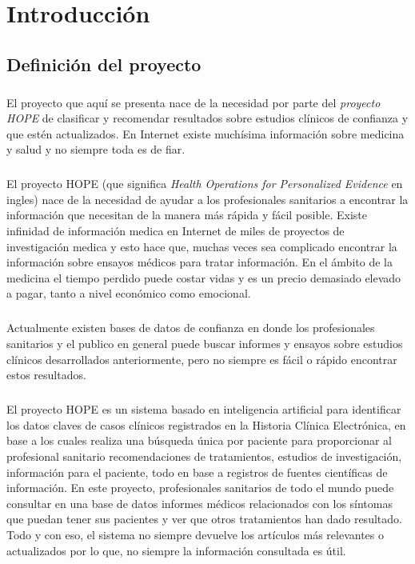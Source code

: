 \documentclass[10pt,a4paper,oneside]{book}
\begin{document}
\chapter{Introducción}

\section{Definición del proyecto}
\label{def:def1}

\paragraph{}
El proyecto que aquí se presenta nace de la necesidad por parte del \textit{proyecto HOPE} de clasificar y recomendar resultados sobre estudios clínicos de confianza y que estén actualizados. En Internet existe muchísima información sobre medicina y salud y no siempre toda es de fiar.

\paragraph{}
El proyecto HOPE (que significa \textit{Health Operations for Personalized Evidence} en ingles) nace de la necesidad de ayudar a los profesionales sanitarios a encontrar la información que necesitan de la manera más rápida y fácil posible. Existe infinidad de información medica en Internet de miles de proyectos de investigación medica y esto hace que, muchas veces sea complicado encontrar la información sobre ensayos médicos para tratar información. En el ámbito de la medicina el tiempo perdido puede costar vidas y es un precio demasiado elevado a pagar, tanto a nivel económico como emocional.

\paragraph{}
Actualmente existen bases de datos de confianza en donde los profesionales sanitarios y el publico en general puede buscar informes y ensayos sobre estudios clínicos desarrollados anteriormente, pero no siempre es fácil o rápido encontrar estos resultados.

\paragraph{}
El proyecto HOPE es un sistema basado en inteligencia artificial para identificar los datos claves de casos clínicos registrados en la Historia Clínica Electrónica, en base a los cuales realiza una búsqueda única por paciente para proporcionar al profesional sanitario recomendaciones de tratamientos, estudios de investigación, información para el paciente, todo en base a registros de fuentes científicas de información. En este proyecto, profesionales sanitarios de todo el mundo puede consultar en una base de datos informes médicos relacionados con los síntomas que puedan tener sus pacientes y ver que otros tratamientos han dado resultado. Todo y con eso, el sistema no siempre devuelve los artículos más relevantes o actualizados por lo que, no siempre la información consultada es útil.
\end{document}
